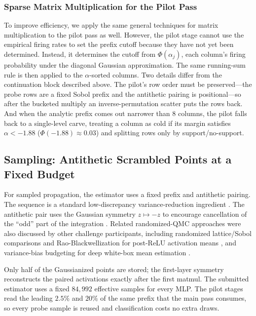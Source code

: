 \subsubsection{Sparse Matrix Multiplication for the Pilot Pass}

To improve efficiency, we apply the same general techniques for matrix multiplication to the pilot pass as well. However, the pilot stage cannot use the empirical firing rates to set the prefix cutoff because they have not yet been determined. Instead, it determines the cutoff from $\Phi(\alpha_j)$, each column's firing probability under the diagonal Gaussian approximation. The same running-sum rule is then applied to the $\alpha$-sorted columns. Two details differ from the continuation block described above. The pilot's row order must be preserved---the probe rows are a fixed Sobol prefix and the antithetic pairing is positional---so after the bucketed multiply an inverse-permutation scatter puts the rows back. And when the analytic prefix comes out narrower than $8$ columns, the pilot falls back to a single-level carve, treating a column as cold if its margin satisfies $\alpha < -1.88$ ($\Phi(-1.88) \approx 0.03$) and splitting rows only by support/no-support.

\subsection{Sampling: Antithetic Scrambled \sobol{} Points at a Fixed Budget}

For sampled propagation, the estimator uses a fixed \sobol{} prefix and antithetic pairing. The \sobol{} sequence is a standard low-discrepancy variance-reduction ingredient \citep{sobol1967distribution}. The antithetic pair uses the Gaussian symmetry $z\mapsto -z$ to encourage cancellation of the ``odd'' part of the integration \citep[Section~8.2]{owen2013montecarlo}. Related randomized-QMC approaches were also discussed by other challenge participants, including randomized lattice/Sobol comparisons and Rao-Blackwellization for post-ReLU activation means \citep{aicrowdRqmcRaoBlackwell2026}, and variance-bias budgeting for deep white-box mean estimation \citep{aicrowdVarianceBiasBudget2026}. 

Only half of the Gaussianized points are stored; the first-layer symmetry reconstructs the paired activations exactly after the first matmul. The submitted estimator uses a fixed $84{,}992$ effective samples for every MLP. The pilot stages read the leading $2.5\%$ and $20\%$ of the same \sobol{} prefix that the main pass consumes, so every probe sample is reused and classification costs no extra draws. 
